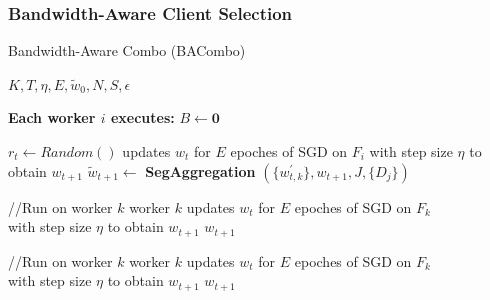 \subsubsection{Bandwidth-Aware Client Selection}
\begin{algorithm}[!t]

\caption{Bandwidth-Aware Combo (BACombo)}

\renewcommand{\algorithmicrequire}{\textbf{Input:}}
\renewcommand{\algorithmicensure}{\textbf{Output:}}


\begin{algorithmic}[1]
\REQUIRE $K, T, \eta, E, \widetilde{w}_0, N, S, \epsilon $

\STATE \textbf{Each worker $i$ executes:}
\STATE $ B \leftarrow \mathbf{0} $

    \STATE $r_t \leftarrow Random()$ 
    \STATE updates ${ w}_{t}$ for $E$ epoches of SGD on $F_i$  with step size $\eta$ to obtain ${ w}_{t+1}$
    \ENDIF
    \STATE $\widetilde{{w}}_{t+1} \leftarrow$ \textbf{SegAggregation} $(\{{w}_{t,k}^\prime\},{{w}}_{t+1},J ,\{D_j\})$
\ENDFOR
\item[]

\STATE {}//Run on worker $k$
{
    \STATE \quad worker $k$ updates $w_t$ for $E$ epoches of SGD on $F_k$ \\ \quad with step size $\eta$ to obtain $w_{t+1}$
\RETURN $w_{t+1}$ 
}

\item[]

\STATE {}//Run on worker $k$
{
    \STATE \quad worker $k$ updates $w_t$ for $E$ epoches of SGD on $F_k$ \\ \quad with step size $\eta$ to obtain $w_{t+1}$
\RETURN $w_{t+1}$ 
}

\end{algorithmic}	\label{BACombo} 
\end{algorithm}

            
            
